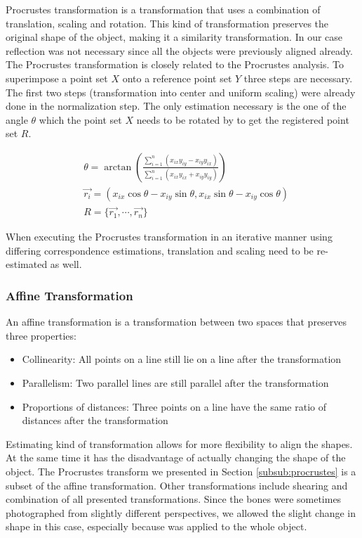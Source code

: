 \documentclass[pdftex,12pt,a4paper]{report}
\begin{document}
Procrustes transformation is a transformation that uses a combination of translation, scaling and rotation. This kind of
transformation preserves the original shape of the object, making it a similarity transformation. In our case reflection
was not necessary since all the objects were previously aligned already. The Procrustes transformation is closely related to the
Procrustes analysis. To superimpose a point set $X$ onto a reference point set $Y$ three steps are necessary. The first
two steps (transformation into center and uniform scaling) were already done in the normalization step. The only
estimation necessary is the one of the angle $\theta$ which the point set $X$ needs to be rotated by to get the registered
point set $R$.

\begin{equation}
\begin{split}
& \theta = \arctan{\left( \frac{\sum\limits_{i = 1}^n(x_{ix}y_{iy} - x_{iy} y_{ix})}{\sum\limits_{i = 1}^n (x_{ix} y_{ix} + x_{iy} y_{iy}) } \right)} \\
& \vec{r_i} = { (x_{ix} \cos\theta - x_{iy} \sin\theta, x_{ix} \sin\theta - x_{iy} \cos\theta) } \\
& R = \{ \vec{r_1}, \cdots, \vec{r_n} \}
\end{split}
\end{equation}

When executing the Procrustes transformation in an iterative manner using differing correspondence estimations,
translation and scaling need to be re-estimated as well.

\subsubsection{Affine Transformation}
\label{subsub:affine}

An affine transformation is a transformation between two spaces that preserves three properties:

\begin{itemize}
\item Collinearity: All points on a line still lie on a line after the transformation
\item Parallelism: Two parallel lines are still parallel after the transformation
\item Proportions of distances: Three points on a line have the same ratio of distances after the transformation
\end{itemize}

Estimating kind of transformation allows for more flexibility to align the shapes. At the same time it has the
disadvantage of actually changing the shape of the object. The Procrustes transform we presented in Section
\ref{subsub:procrustes} is a subset of the affine transformation. Other transformations include shearing and combination of all presented transformations. Since the bones were sometimes photographed from
slightly different perspectives, we allowed the slight change in shape in this case, especially because was
applied to the whole object.
\end{document}
